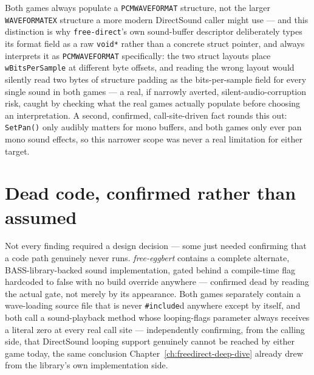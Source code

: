 Both games always populate a \texttt{PCMWAVEFORMAT} structure, not the larger
\texttt{WAVEFORMATEX} structure a more modern DirectSound caller might use --- and this
distinction is why \texttt{free-direct}'s own sound-buffer descriptor deliberately types its
format field as a raw \texttt{void*} rather than a concrete struct pointer, and always
interprets it as \texttt{PCMWAVEFORMAT} specifically: the two struct layouts place
\texttt{wBitsPerSample} at different byte offsets, and reading the wrong layout would silently
read two bytes of structure padding as the bits-per-sample field for every single sound in
both games --- a real, if narrowly averted, silent-audio-corruption risk, caught by checking
what the real games actually populate before choosing an interpretation. A second, confirmed,
call-site-driven fact rounds this out: \texttt{SetPan()} only audibly matters for mono
buffers, and both games only ever pan mono sound effects, so this narrower scope was never a
real limitation for either target.

\section{Dead code, confirmed rather than assumed}

Not every finding required a design decision --- some just needed confirming that a code path
genuinely never runs. \emph{free-eggbert} contains a complete alternate, BASS-library-backed
sound implementation, gated behind a compile-time flag hardcoded to false with no build
override anywhere --- confirmed dead by reading the actual gate, not merely by its
appearance. Both games separately contain a wave-loading source file that is never
\texttt{\#include}d anywhere except by itself, and both call a sound-playback method whose
looping-flags parameter always receives a literal zero at every real call site --- independently
confirming, from the calling side, that DirectSound looping support genuinely cannot be
reached by either game today, the same conclusion Chapter~\ref{ch:freedirect-deep-dive}
already drew from the library's own implementation side.

